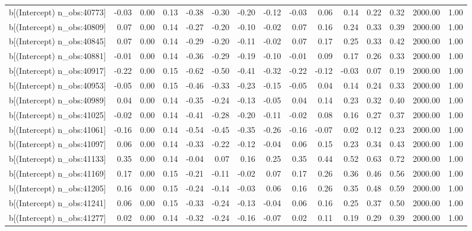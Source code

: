 \begin{table}[ht]
\begin{tabular}{rrrrrrrrrrrrrrr}
  b[(Intercept) n\_obs:40773] & -0.03 & 0.00 & 0.13 & -0.38 & -0.30 & -0.20 & -0.12 & -0.03 & 0.06 & 0.14 & 0.22 & 0.32 & 2000.00 & 1.00 \\ 
  b[(Intercept) n\_obs:40809] & 0.07 & 0.00 & 0.14 & -0.27 & -0.20 & -0.10 & -0.02 & 0.07 & 0.16 & 0.24 & 0.33 & 0.39 & 2000.00 & 1.00 \\ 
  b[(Intercept) n\_obs:40845] & 0.07 & 0.00 & 0.14 & -0.29 & -0.20 & -0.11 & -0.02 & 0.07 & 0.17 & 0.25 & 0.33 & 0.42 & 2000.00 & 1.00 \\ 
  b[(Intercept) n\_obs:40881] & -0.01 & 0.00 & 0.14 & -0.36 & -0.29 & -0.19 & -0.10 & -0.01 & 0.09 & 0.17 & 0.26 & 0.33 & 2000.00 & 1.00 \\ 
  b[(Intercept) n\_obs:40917] & -0.22 & 0.00 & 0.15 & -0.62 & -0.50 & -0.41 & -0.32 & -0.22 & -0.12 & -0.03 & 0.07 & 0.19 & 2000.00 & 1.00 \\ 
  b[(Intercept) n\_obs:40953] & -0.05 & 0.00 & 0.15 & -0.46 & -0.33 & -0.23 & -0.15 & -0.05 & 0.04 & 0.14 & 0.24 & 0.33 & 2000.00 & 1.00 \\ 
  b[(Intercept) n\_obs:40989] & 0.04 & 0.00 & 0.14 & -0.35 & -0.24 & -0.13 & -0.05 & 0.04 & 0.14 & 0.23 & 0.32 & 0.40 & 2000.00 & 1.00 \\ 
  b[(Intercept) n\_obs:41025] & -0.02 & 0.00 & 0.14 & -0.41 & -0.28 & -0.20 & -0.11 & -0.02 & 0.08 & 0.16 & 0.27 & 0.37 & 2000.00 & 1.00 \\ 
  b[(Intercept) n\_obs:41061] & -0.16 & 0.00 & 0.14 & -0.54 & -0.45 & -0.35 & -0.26 & -0.16 & -0.07 & 0.02 & 0.12 & 0.23 & 2000.00 & 1.00 \\ 
  b[(Intercept) n\_obs:41097] & 0.06 & 0.00 & 0.14 & -0.33 & -0.22 & -0.12 & -0.04 & 0.06 & 0.15 & 0.23 & 0.34 & 0.43 & 2000.00 & 1.00 \\ 
  b[(Intercept) n\_obs:41133] & 0.35 & 0.00 & 0.14 & -0.04 & 0.07 & 0.16 & 0.25 & 0.35 & 0.44 & 0.52 & 0.63 & 0.72 & 2000.00 & 1.00 \\ 
  b[(Intercept) n\_obs:41169] & 0.17 & 0.00 & 0.15 & -0.21 & -0.11 & -0.02 & 0.07 & 0.17 & 0.26 & 0.36 & 0.46 & 0.56 & 2000.00 & 1.00 \\ 
  b[(Intercept) n\_obs:41205] & 0.16 & 0.00 & 0.15 & -0.24 & -0.14 & -0.03 & 0.06 & 0.16 & 0.26 & 0.35 & 0.48 & 0.59 & 2000.00 & 1.00 \\ 
  b[(Intercept) n\_obs:41241] & 0.06 & 0.00 & 0.15 & -0.33 & -0.24 & -0.13 & -0.04 & 0.06 & 0.16 & 0.25 & 0.37 & 0.50 & 2000.00 & 1.00 \\ 
  b[(Intercept) n\_obs:41277] & 0.02 & 0.00 & 0.14 & -0.32 & -0.24 & -0.16 & -0.07 & 0.02 & 0.11 & 0.19 & 0.29 & 0.39 & 2000.00 & 1.00 \\ 

\end{tabular}
\end{table}
